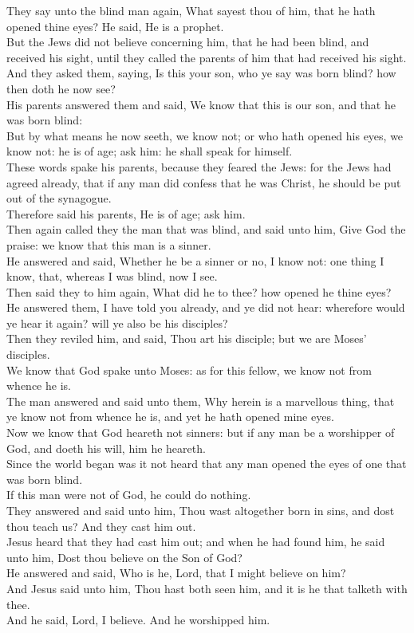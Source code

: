 \documentclass[10pt]{article} %
\begin{document}
{\begin{minipage}[t]{0.49\textwidth}
They say unto the blind man again, What sayest thou of him, that he hath opened thine eyes? He said, He is a prophet.\\
But the Jews did not believe concerning him, that he had been blind, and received his sight, until they called the parents of him that had received his sight.\\
And they asked them, saying, Is this your son, who ye say was born blind? how then doth he now see?\\
His parents answered them and said, We know that this is our son, and that he was born blind:\\
But by what means he now seeth, we know not; or who hath opened his eyes, we know not: he is of age; ask him: he shall speak for himself.\\
These words spake his parents, because they feared the Jews: for the Jews had agreed already, that if any man did confess that he was Christ, he should be put out of the synagogue.\\
Therefore said his parents, He is of age; ask him.\\
Then again called they the man that was blind, and said unto him, Give God the praise: we know that this man is a sinner.\\
He answered and said, Whether he be a sinner or no, I know not: one thing I know, that, whereas I was blind, now I see.\\
Then said they to him again, What did he to thee? how opened he thine eyes?\\
He answered them, I have told you already, and ye did not hear: wherefore would ye hear it again? will ye also be his disciples?\\
Then they reviled him, and said, Thou art his disciple; but we are Moses' disciples.\\
We know that God spake unto Moses: as for this fellow, we know not from whence he is.\\
The man answered and said unto them, Why herein is a marvellous thing, that ye know not from whence he is, and yet he hath opened mine eyes.\\
Now we know that God heareth not sinners: but if any man be a worshipper of God, and doeth his will, him he heareth.\\
Since the world began was it not heard that any man opened the eyes of one that was born blind.\\
If this man were not of God, he could do nothing.\\
They answered and said unto him, Thou wast altogether born in sins, and dost thou teach us? And they cast him out.\\
Jesus heard that they had cast him out; and when he had found him, he said unto him, Dost thou believe on the Son of God?\\
He answered and said, Who is he, Lord, that I might believe on him?\\
And Jesus said unto him, Thou hast both seen him, and it is he that talketh with thee.\\
And he said, Lord, I believe. And he worshipped him.\\
\end{minipage}}
\end{document}

